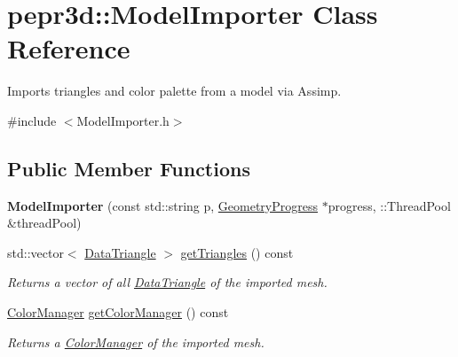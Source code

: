 \hypertarget{classpepr3d_1_1_model_importer}{}\section{pepr3d\+::Model\+Importer Class Reference}
\label{classpepr3d_1_1_model_importer}


Imports triangles and color palette from a model via Assimp.  




{\ttfamily \#include $<$Model\+Importer.\+h$>$}

\subsection*{Public Member Functions}
\begin{DoxyCompactItemize}
\item 
\mbox{\label{classpepr3d_1_1_model_importer_ae34f94fa256e598818039431f49f8709}} 
{\bfseries Model\+Importer} (const std\+::string p, \mbox{\hyperlink{structpepr3d_1_1_geometry_progress}{Geometry\+Progress}} $\ast$progress, \+::Thread\+Pool \&thread\+Pool)
\item 
\mbox{\label{classpepr3d_1_1_model_importer_aca674c511db529638e83ade8aad83e24}} 
std\+::vector$<$ \mbox{\hyperlink{classpepr3d_1_1_data_triangle}{Data\+Triangle}} $>$ \mbox{\hyperlink{classpepr3d_1_1_model_importer_aca674c511db529638e83ade8aad83e24}{get\+Triangles}} () const
\begin{DoxyCompactList}\small\item\em Returns a vector of all \mbox{\hyperlink{classpepr3d_1_1_data_triangle}{Data\+Triangle}} of the imported mesh. \end{DoxyCompactList}\item 
\mbox{\label{classpepr3d_1_1_model_importer_aa3ba28412e9317aff4850ccd251e721e}} 
\mbox{\hyperlink{classpepr3d_1_1_color_manager}{Color\+Manager}} \mbox{\hyperlink{classpepr3d_1_1_model_importer_aa3ba28412e9317aff4850ccd251e721e}{get\+Color\+Manager}} () const
\begin{DoxyCompactList}\small\item\em Returns a \mbox{\hyperlink{classpepr3d_1_1_color_manager}{Color\+Manager}} of the imported mesh. \end{DoxyCompactList}\item 

\end{DoxyCompactItemize}
